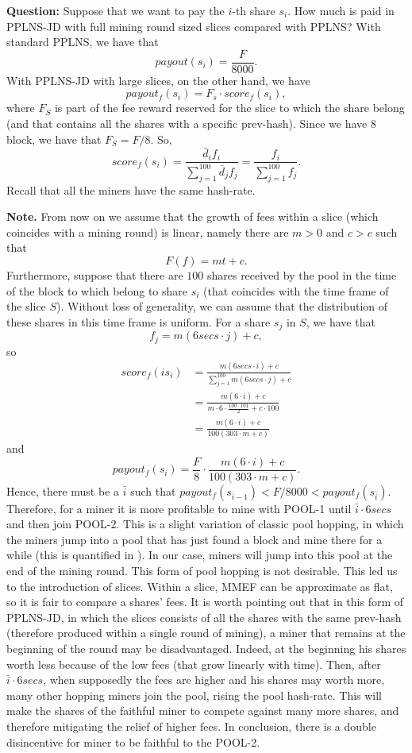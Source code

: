 \documentclass[10pt]{article}
\begin{document}
\textbf{Question:} Suppose that we want to pay the $i$-th share $s_i$. How much is paid in PPLNS-JD with full mining round sized slices compared with PPLNS?
With standard PPLNS, we have that
\[payout(s_i) = \frac{F}{8000}.\]
With PPLNS-JD with large slices, on the other hand, we have
\[payout_f(s_i) = F_s\cdot score_f(s_i),\]
where $F_S$ is part of the fee reward reserved for the slice to which the share belong (and that contains all the shares with a specific prev-hash). Since we have $8$ block, we have that $F_S = F/8$. So,
\[score_f(s_i) = \frac{\bar d_i f_i}{\sum_{j=1}^{100} \bar d_j f_j}= \frac{ f_i}{\sum_{j=1}^{100} f_j}. \]
Recall that all the miners have the same hash-rate.

\textbf{Note.} From now on we assume that the growth of fees within a slice (which coincides with a mining round) is linear, namely there are $m>0$ and $c>c$ such that 
\[F(f) = mt+c.\]
Furthermore, suppose that there are $100$ shares received by the pool in the time of the block to which belong to share $s_i$ (that coincides with the time frame of the slice $S$). Without loss of generality, we can assume that the distribution of these shares in this time frame is uniform. For a share $s_j$ in $S$, we have that 
\[ f_j = m(6secs \cdot j) +c,\]
so
\begin{align*}
	score_f(is_i) &= \frac{m(6secs\cdot i) +c}{\sum_{j=1}^{100} m(6secs\cdot j) +c}\\
	&= \frac{m(6\cdot i) +c}{m\cdot 6\cdot\frac{100\cdot101}{2} +c\cdot 100}\\
	&= \frac{m(6\cdot i) +c}{100(303\cdot m +c)}
\end{align*}
and 
\[payout_f(s_i) = \frac{F}{8} \cdot \frac{m(6\cdot i) +c}{100(303\cdot m +c)}.\]
Hence, there must be a $\bar i$ such that $payout_f(s_{\bar i -1})< F/8000<payout_f(s_{\bar i })$.
Therefore, for a miner it is more profitable to mine with POOL-1 until $\bar i \cdot 6 secs$ and then join POOL-2. This is a slight variation of classic pool hopping, in which the miners jump into a pool that has just found a block and mine there for a while (this is quantified in \cite{rosenfeld}). In our case, miners will jump into this pool at the end of the mining round. This form of pool hopping is not desirable. This led us to the introduction of slices. Within a slice, MMEF can be approximate as flat, so it is fair to compare a shares' fees.
It is worth pointing out that in this form of PPLNS-JD, in which the slices consists of all the shares with the same prev-hash (therefore produced within a single round of mining), a miner that remains at the beginning of the round may be disadvantaged. Indeed, at the beginning his shares worth less because of the low fees (that grow linearly with time). Then, after $\bar i \cdot 6 secs$, when supposedly the fees are higher and his shares may worth more, many other hopping miners join the pool, rising the pool hash-rate. This will make the shares of the faithful miner to compete against many more shares, and therefore mitigating the relief of higher fees. In conclusion, there is a double disincentive for miner to be faithful to the POOL-2.
\end{document}
